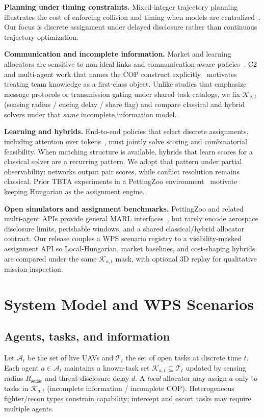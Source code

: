 \documentclass[journal,twocolumn,10pt]{IEEEtran}
\begin{document}
\textbf{Planning under timing constraints.}
Mixed-integer trajectory planning illustrates the cost of enforcing collision and timing when models are centralized~\cite{richards2002aircraft}.
Our focus is discrete assignment under delayed disclosure rather than continuous trajectory optimization.

\textbf{Communication and incomplete information.}
Market and learning allocators are sensitive to non-ideal links and communication-aware policies~\cite{cao2025communication,raja2021communication,xiong2026cata}.
C2 and multi-agent work that names the COP construct explicitly~\cite{mcneese2006cop,yu2023cop} motivates treating team knowledge as a first-class object.
Unlike studies that emphasize message protocols or transmission gating under shared task catalogs, we fix \(\mathcal{K}_{a,t}\) (sensing radius / cueing delay / share flag) and compare classical and hybrid solvers under that \emph{same} incomplete information model.

\textbf{Learning and hybrids.}
End-to-end policies that select discrete assignments, including attention over tokens~\cite{vaswani2017attention}, must jointly solve scoring and combinatorial feasibility.
When matching structure is available, hybrids that learn scores for a classical solver are a recurring pattern.
We adopt that pattern under partial observability: networks output pair scores, while conflict resolution remains classical.
Prior TBTA experiments in a PettingZoo environment~\cite{terry2021pettingzoo} motivate keeping Hungarian as the assignment engine.

\textbf{Open simulators and assignment benchmarks.}
PettingZoo and related multi-agent APIs provide general MARL interfaces~\cite{terry2021pettingzoo}, but rarely encode aerospace disclosure limits, perishable windows, and a shared classical/hybrid allocator contract.
Our release couples a WPS scenario registry to a visibility-masked assignment API so Local-Hungarian, market baselines, and cost-shaping hybrids are compared under the same \(\mathcal{K}_{a,t}\) mask, with optional 3D replay for qualitative mission inspection.

\section{System Model and WPS Scenarios}
\subsection{Agents, tasks, and information}
Let \(\mathcal{A}_t\) be the set of live UAVs and \(\mathcal{T}_t\) the set of open tasks at discrete time \(t\).
Each agent \(a\in\mathcal{A}_t\) maintains a known-task set \(\mathcal{K}_{a,t}\subseteq\mathcal{T}_t\) updated by sensing radius \(R_{\mathrm{sense}}\) and threat-disclosure delay \(d\).
A \emph{local} allocator may assign \(a\) only to tasks in \(\mathcal{K}_{a,t}\) (incomplete information / incomplete COP).
Heterogeneous fighter/recon types constrain capability; intercept and escort tasks may require multiple agents.
\end{document}
